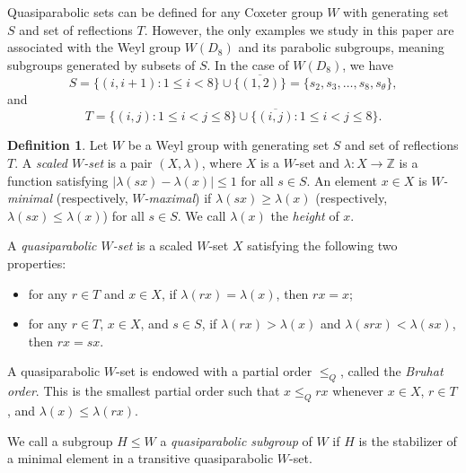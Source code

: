 \documentclass{amsart}
\theoremstyle{plain}
\theoremstyle{definition}
\newtheorem{defn}[theorem]{Definition}
\theoremstyle{remark}
\numberwithin{equation}{section}
\newcommand{\Z}{{\mathbb Z}}
\begin{document}
Quasiparabolic sets can be defined for any Coxeter group $W$ with generating set $S$ and set of reflections $T$. However, 
the only examples we study in this paper are associated with the Weyl group $W(D_8)$ and its parabolic subgroups, meaning 
subgroups generated by subsets of $S$. In the case of $W(D_8)$, we have $$
S = \{(i, i+1) : 1 \leq i < 8\} \cup \{\overline{(1, 2)}\} = \{s_2, s_3, \ldots, s_8, s_\theta\}
,$$ and $$
T = \{(i, j) : 1 \leq i < j \leq 8\} \cup 
\{\overline{(i, j)} : 1 \leq i < j \leq 8\} 
.$$ 

\begin{defn}\label{def:qpset}
Let $W$ be a Weyl group with generating set $S$ and set of reflections $T$. A {\it scaled $W$-set} is a pair $(X, \lambda)$, 
where $X$ is a $W$-set and $\lambda : X \rightarrow \Z$ is a function satisfying $|\lambda(sx) - \lambda(x)| \leq 1$ for all $s \in S$.
An element $x \in X$ is {\it $W$-minimal} (respectively, {\it $W$-maximal}) if $\lambda(sx) \geq \lambda(x)$ (respectively, 
$\lambda(sx) \leq \lambda(x)$) for all $s \in S$. We call $\lambda(x)$ the {\it height} of $x$.

A {\it quasiparabolic $W$-set} is a scaled $W$-set $X$ satisfying the following
two properties:
\begin{itemize}
\item[(QP1)]{for any $r \in T$ and $x \in X$, if $\lambda(rx) = \lambda(x)$, then $rx = x$;}
\item[(QP2)]{for any $r \in T$, $x \in X$, and $s \in S$, if $\lambda(rx) > \lambda(x)$ and $\lambda(srx) < \lambda(sx)$, then $rx = sx$.}
\end{itemize}

A quasiparabolic $W$-set is endowed with a partial order $\leq_Q$, called the {\it Bruhat order}. This is the smallest partial order 
such that $x \leq_Q rx$ whenever $x \in X$, $r \in T$, and $\lambda(x) \leq \lambda(rx)$.

We call a subgroup $H \leq W$ a {\it quasiparabolic subgroup} of $W$ if $H$ is the stabilizer of a minimal element in a
transitive quasiparabolic $W$-set.
\end{defn}

\end{document}
